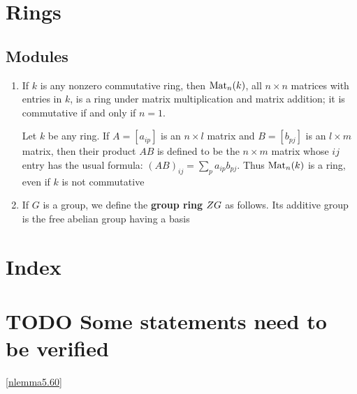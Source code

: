 \documentclass[11pt]{article}
\begin{document}
\section{Rings}
\label{sec:org44e05e9}
\subsection{Modules}
\label{sec:org5565ac3}
\begin{examplle}[]
\begin{enumerate}
\item If \(k\) is any nonzero commutative ring, then \(\operatorname{Mat}_n(k)\), all
\(n\times n\)  matrices with entries in \(k\), is a ring under matrix
multiplication and matrix addition; it is commutative if and only if
\(n=1\).

Let \(k\) be any ring. If \(A=[a_{ip}]\) is an \(n\times l\) matrix and
\(B=[b_{pj}]\) is an \(l\times m\) matrix, then their product \(AB\) is
defined to be the \(n\times m\) matrix whose \(ij\) entry has the usual
formula: \((AB)_{ij}=\sum_pa_{ip}b_{pj}\). Thus \(\operatorname{Mat}_n(k)\) is a ring,
even if \(k\) is not commutative

\item If \(G\) is a group, we define the \textbf{group ring} \(\relax{Z} G\) as follows. Its
additive group is the free abelian group having a basis
\end{enumerate}
\end{examplle}
\section{Index}
\label{sec:orgeff7ee7}
\renewcommand{\indexname}{}
\printindex
\section{{\bfseries\sffamily TODO} Some statements need to be verified}
\label{sec:orgfea4f77}
\ref{nlemma5.60}
\end{document}
